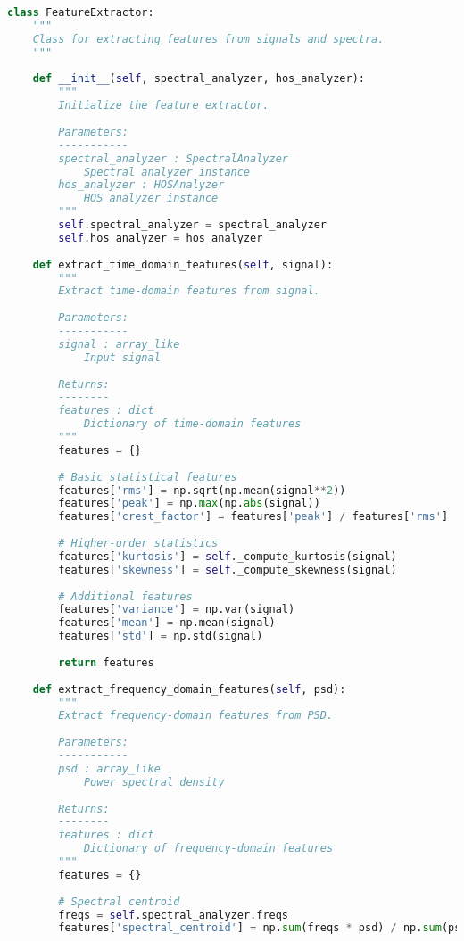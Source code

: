\begin{lstlisting}[language=Python, caption=FeatureExtractor class for comprehensive feature extraction]
class FeatureExtractor:
    """
    Class for extracting features from signals and spectra.
    """
    
    def __init__(self, spectral_analyzer, hos_analyzer):
        """
        Initialize the feature extractor.
        
        Parameters:
        -----------
        spectral_analyzer : SpectralAnalyzer
            Spectral analyzer instance
        hos_analyzer : HOSAnalyzer
            HOS analyzer instance
        """
        self.spectral_analyzer = spectral_analyzer
        self.hos_analyzer = hos_analyzer
        
    def extract_time_domain_features(self, signal):
        """
        Extract time-domain features from signal.
        
        Parameters:
        -----------
        signal : array_like
            Input signal
            
        Returns:
        --------
        features : dict
            Dictionary of time-domain features
        """
        features = {}
        
        # Basic statistical features
        features['rms'] = np.sqrt(np.mean(signal**2))
        features['peak'] = np.max(np.abs(signal))
        features['crest_factor'] = features['peak'] / features['rms']
        
        # Higher-order statistics
        features['kurtosis'] = self._compute_kurtosis(signal)
        features['skewness'] = self._compute_skewness(signal)
        
        # Additional features
        features['variance'] = np.var(signal)
        features['mean'] = np.mean(signal)
        features['std'] = np.std(signal)
        
        return features
    
    def extract_frequency_domain_features(self, psd):
        """
        Extract frequency-domain features from PSD.
        
        Parameters:
        -----------
        psd : array_like
            Power spectral density
            
        Returns:
        --------
        features : dict
            Dictionary of frequency-domain features
        """
        features = {}
        
        # Spectral centroid
        freqs = self.spectral_analyzer.freqs
        features['spectral_centroid'] = np.sum(freqs * psd) / np.sum(psd)
        

\end{lstlisting}
